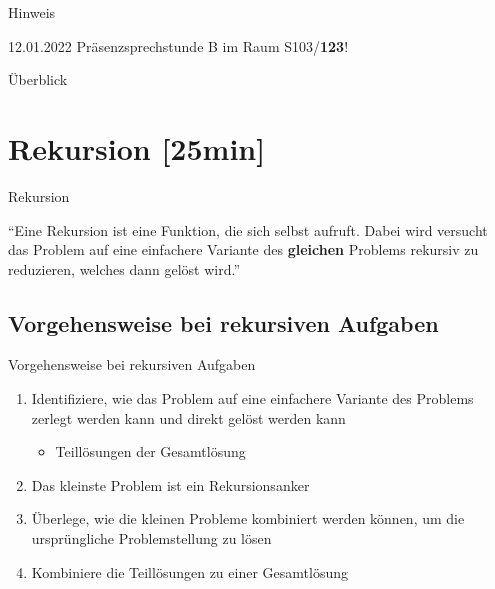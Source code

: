 \documentclass{../tuda-beamer}
\date{15. Dezember 2021}
\begin{document}
    \maketitle

    \begin{frame}[c]{Hinweis}
        \begin{center}
        {\Large 12.01.2022 Präsenzsprechstunde B im Raum S103/\textbf{123}!}
        \end{center}
    \end{frame}

    \begin{frame}{Überblick}
        \tableofcontents
    \end{frame}


    \section{Rekursion [25min]}
    \begin{frame}[c]{Rekursion}
        \begin{center}
            \enquote{Eine Rekursion ist eine Funktion, die sich selbst aufruft. Dabei wird versucht
            das Problem auf eine einfachere Variante des \textbf{gleichen} Problems rekursiv zu
            reduzieren, welches dann gelöst wird.}
        \end{center}
    \end{frame}

    \subsection{Vorgehensweise bei rekursiven Aufgaben}
    \begin{frame}{Vorgehensweise bei rekursiven Aufgaben}
        \begin{enumerate}
            \item Identifiziere, wie das Problem auf eine einfachere Variante des Problems
            zerlegt werden kann und direkt gelöst werden kann

            \begin{itemize}
                \item Teillösungen der Gesamtlösung
            \end{itemize}
            \item Das kleinste Problem ist ein Rekursionsanker
            \item Überlege, wie die kleinen Probleme kombiniert werden können, um die
            ursprüngliche Problemstellung zu lösen
            \item Kombiniere die Teillösungen zu einer Gesamtlösung
        \end{enumerate}
    \end{frame}
\end{document}

